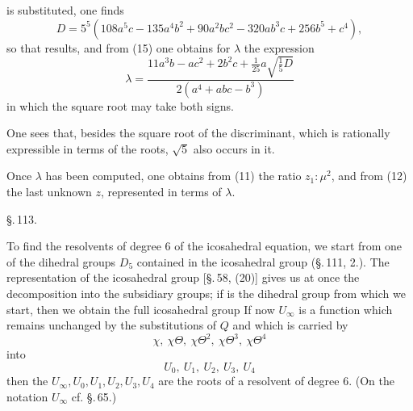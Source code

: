 is substituted, one finds
\[
D = 5^5(108a^5c-135a^4b^2+90a^2bc^2 - 320ab^3c+256b^5+c^4),
\]
so that
results, and from (15) one obtains for $\lambda$ the expression
\[
\lambda = \frac{11a^3b - ac^2 + 2b^2c + \frac{1}{25}a\sqrt{\frac{1}{5}D}}{2(a^4+abc-b^3)}
\]
in which the square root may take both signs.

One sees that, besides the square root of the discriminant, which is rationally expressible in terms of the roots, $\sqrt5$ also occurs in it.

Once $\lambda$ has been computed, one obtains from (11) the ratio $z_1:\mu^2$, and from (12) the last unknown $z$, represented  in terms of $\lambda$.

\begin{center}
\S.\,113.

\end{center}

To find the resolvents of degree $6$ of the icosahedral equation, we start from one of the dihedral groups $D_5$ contained in the icosahedral group (\S.\,111, 2.). The representation of the icosahedral group [\S.\,58, (20)] gives us at once the decomposition into the subsidiary groups; if
is the dihedral group from which we start, then we obtain the full icosahedral group
If now $U_\infty$ is a function which remains unchanged by the substitutions of $Q$ and which is carried by
\[
\chi,\ \chi\Theta,\ \chi\Theta^2,\ \chi\Theta^3,\ \chi\Theta^4
\]
into
\[
U_0,\ U_1,\ U_2,\ U_3,\ U_4
\]
then the $U_\infty, U_0, U_1, U_2, U_3, U_4$ are the roots of a resolvent of degree $6$. (On the notation $U_\infty$ cf. \S.\,65.)
